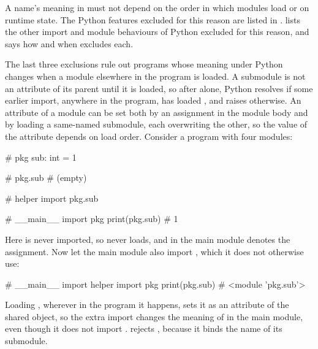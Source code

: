 A name's meaning in \PurePy must not depend on the order in which modules load or on runtime state.
The Python features excluded for this reason are listed in .
 lists the other import and module behaviours of Python excluded for this reason, and says
how and when \PurePy excludes each.



The last three exclusions rule out programs whose meaning under Python changes when a module elsewhere in
the program is loaded. A submodule is not an attribute of its parent until it is loaded, so after
 alone, Python resolves  if some earlier import, anywhere in the
program, has loaded , and raises  otherwise. An attribute of a
module can be set both by an assignment in the module body and by loading a same-named submodule, each
overwriting the other, so the value of the attribute depends on load order. Consider a program with four
modules:

\begin{minipage}[t]{0.2\textwidth}
\begin{python}
# pkg
sub: int = 1
\end{python}
\end{minipage}
\hfill
\begin{minipage}[t]{0.2\textwidth}
\begin{python}
# pkg.sub
# (empty)
\end{python}
\end{minipage}
\hfill
\begin{minipage}[t]{0.25\textwidth}
\begin{python}
# helper
import pkg.sub
\end{python}
\end{minipage}
\hfill
\begin{minipage}[t]{0.28\textwidth}
\begin{python}
# __main__
import pkg
print(pkg.sub) # 1
\end{python}
\end{minipage}

Here  is never imported, so  never loads, and  in the
main module denotes the assignment. Now let the main module also import , which it does not
otherwise use:

\begin{python}
# __main__
import helper
import pkg
print(pkg.sub) # <module 'pkg.sub'>
\end{python}

Loading , wherever in the program it happens, sets it as an attribute of the shared
 object, so the extra import changes the meaning of  in the main module, even though
it does not import . \PurePy rejects , because it binds the name of its submodule.
